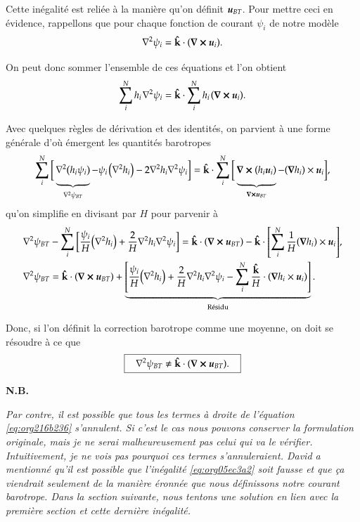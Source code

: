 \documentclass[10pt]{article}
\numberwithin{equation}{section}
\newcommand{\kvf}{\vb{\hat{k}}}
\newcommand{\uu}{\vb*{u}}
\newcommand{\pt}{\hspace{1pt}}
\newcommand{\grande}{\vphantom{\frac{1}{xx}}}
\newcommand{\nb}{\textbf{N.B.}\hspace{4pt}}
\begin{document}
Cette inégalité est reliée à la manière qu'on définit \(\uu_{BT}\).
Pour mettre ceci en évidence, rappellons que pour chaque fonction de courant \(\psi_i\) de notre modèle
\begin{equation}
   \laplacian{\psi_i} = \kvf\cdot\qty(\curl{\uu_i}).
\end{equation}

On peut donc sommer l'ensemble de ces équations et l'on obtient
\begin{equation}
   \sum_i^Nh_i\pt\laplacian{\psi_i} = \kvf\cdot \sum_i^N h_i\pt \qty(\curl{\uu_i}).
\end{equation}

Avec quelques règles de dérivation et des identités, on parvient à une forme générale d'où émergent les quantités barotropes
\begin{align}
   \sum_i^N \bigg[ \underbrace{\grande\laplacian(h_i\psi_i)}_{\laplacian{\psi_{BT}}} - \psi_i\pt\qty(\laplacian{h_i}) - 2 \laplacian{h_i}\laplacian{\psi_i}\bigg]
    = \kvf\cdot \sum_i^N \bigg[ \underbrace{\grande\curl(h_i \uu_i)}_{\curl{\uu_{BT}}}  - \qty(\gradient{h_i})\times\uu_i\bigg],
\end{align}
qu'on simplifie en divisant par \(H\) pour parvenir à
\begin{align}
\label{eq:org216b236}
   &\laplacian{\psi_{BT}} - \sum_i^N \bigg[ \frac{\psi_i}{H} \qty(\laplacian{h_i}) + \frac{2}{H} \laplacian{h_i}\laplacian{\psi_i}\bigg]
    = \kvf\cdot  \qty(\curl{ \uu_{BT}}) - \kvf\cdot \qty[\sum_i^N \frac{1}{H} \qty(\gradient{h_i})\times\uu_i],\nonumber\\
%
   &\laplacian{\psi_{BT}}
    = \kvf\cdot  \qty(\curl{ \uu_{BT}}) + \underbrace{\qty[ \frac{\psi_i}{H} \qty(\laplacian{h_i}) + \frac{2}{H} \laplacian{h_i}\laplacian{\psi_i}  -
\sum_i^N \frac{\kvf}{H}\cdot\qty(\gradient{h_i}\times\uu_i)]}_\text{Résidu}.
\end{align}

Donc, si l'on définit la correction barotrope comme une moyenne, on doit se résoudre à ce que
\begin{equation}
\label{eq:org05ec3a2}
   \boxed{\hspace{0.3cm}\laplacian{\psi_{BT}} \not= \kvf\cdot  \qty(\curl{ \uu_{BT}}).\hspace{0.3cm}}
\end{equation}

\nb\begin{minipage}[t]{0.9\linewidth}
\itshape Par contre, il est possible que tous les termes à droite de l'équation \ref{eq:org216b236} s'annulent.
Si c'est le cas nous pouvons conserver la formulation originale, mais je ne serai malheureusement pas celui qui va le vérifier.
Intuitivement, je ne vois pas pourquoi ces termes s'annuleraient.
David a mentionné qu'il est possible que l'inégalité \ref{eq:org05ec3a2} soit fausse et que ça viendrait seulement de la manière éronnée que nous définissons notre courant barotrope.
Dans la section suivante, nous tentons une solution en lien avec la première section et cette dernière inégalité.
\end{minipage}
\end{document}
